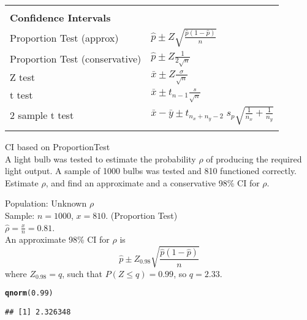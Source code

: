 \documentclass[bigtut]{tutorial}\usepackage[]{graphicx}\usepackage[]{color}
\makeatletter
\newcommand{\hlnum}[1]{\textcolor[rgb]{0.686,0.059,0.569}{#1}}%
\newcommand{\hlstd}[1]{\textcolor[rgb]{0.345,0.345,0.345}{#1}}%
\newcommand{\hlkwd}[1]{\textcolor[rgb]{0.737,0.353,0.396}{\textbf{#1}}}%
\newenvironment{kframe}{%
 \def\at@end@of@kframe{}%
 \ifinner\ifhmode%
  \def\at@end@of@kframe{\end{minipage}}%
  \begin{minipage}{\columnwidth}%
 \fi\fi%
 \def\FrameCommand##1{\hskip\@totalleftmargin \hskip-\fboxsep
 \colorbox{shadecolor}{##1}\hskip-\fboxsep
     \hskip-\linewidth \hskip-\@totalleftmargin \hskip\columnwidth}%
 \MakeFramed {\advance\hsize-\width
   \@totalleftmargin\z@ \linewidth\hsize
   \@setminipage}}%
 {\par\unskip\endMakeFramed%
 \at@end@of@kframe}
\newenvironment{knitrout}{}{} %
\makeatother
\begin{document}

\begin{tutorial}

\begin{center}
\begin{tabular}{| ll |} \hline
& \\
{\bf Confidence Intervals} & \\
Proportion Test  (approx) & $\hat p \pm Z \sqrt{  \frac{ \hat p (1 - \hat p) }{n} }  $ \\
Proportion Test  (conservative) & $\hat p \pm Z  \frac{ 1 }{ 2 \sqrt{n}}   $ \\
Z test &  $\bar x \pm Z  \frac{ \sigma }{ \sqrt{n}}   $ \\
t test &  $\bar x \pm t_{n-1}  \frac{ s }{ \sqrt{n}}   $ \\
2 sample t test &  $\bar x - \bar y \pm t_{n_x+n_y-2} \;   s_p \sqrt{ \frac{1}{n_x}   + \frac{1}{n_y}  }  $ \\
& \\  \hline
\end{tabular}
\end{center}

\vspace{.5cm}
\begin{questions}

\question CI based on ProportionTest \\

A light bulb was tested to estimate the probability $\rho$ of producing the required light output.
A sample of 1000 bulbs was tested and 810 functioned correctly. Estimate $\rho$, and find an approximate and a conservative 98\% CI for $\rho$.
    
\begin{solution}

Population: Unknown $\rho$ \\
Sample: $n=1000$, $x=810$. (Proportion Test) \\

$\hat{\rho} = \frac {x}{n} = 0.81$. \\

\vspace{0.5cm}
An approximate 98\% CI for $\rho$ is
\[ \hat p \pm Z_{0.98} \sqrt{  \frac{ \hat p (1 - \hat p) }{n} } \]
where $Z_{0.98} = q$, such that $P(Z \leq q) = 0.99$, so $q=2.33$. \\

\begin{knitrout}
\color{fgcolor}\begin{kframe}
\begin{alltt}
\hlkwd{qnorm}\hlstd{(}\hlnum{0.99}\hlstd{)}
\end{alltt}
\begin{verbatim}
## [1] 2.326348
\end{verbatim}
\end{kframe}
\end{knitrout}


\end{solution}
\end{questions}
\end{tutorial}
\end{document}
